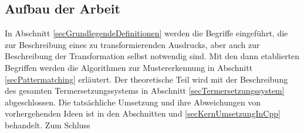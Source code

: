 \subsection{Aufbau der Arbeit}
In Abschnitt \ref{secGrundlegendeDefinitionen} werden die Begriffe eingeführt, die zur Beschreibung eines zu transformierenden Ausdrucks, aber auch zur Beschreibung der Transformation selbst notwendig sind. Mit den dann etablierten Begriffen werden die Algorithmen zur Mustererkennung in Abschnitt \ref{secPattermatching} erläutert.  
Der theoretische Teil wird mit der Beschreibung des gesamten Termersetzungssystems in Abschnitt \ref{secTermersetzungssystem} abgeschlossen.
Die tatsächliche Umsetzung und ihre Abweichungen von vorhergehenden Ideen ist in den Abschnitten  und \ref{secKernUmsetzungInCpp} behandelt. 
Zum Schluss 




